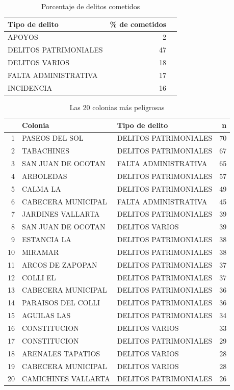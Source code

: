 \begin{table}[H]
\centering
\caption{Porcentaje de delitos cometidos} 
\begin{tabular}{lrr}
  \hline
Tipo de delito & \% de cometidos  \\ 
  \hline
APOYOS & 2 \\ 
  DELITOS PATRIMONIALES & 47 \\ 
  DELITOS VARIOS & 18  \\ 
  FALTA ADMINISTRATIVA & 17  \\ 
  INCIDENCIA & 16  \\ 
   \hline
\end{tabular}
\end{table}

\begin{table}[H]
\centering
\caption{Las 20 colonias más peligrosas} 
\begin{tabular}{rllr}
  \hline
 & Colonia & Tipo de delito & n \\ 
  \hline
1 & PASEOS DEL SOL & DELITOS PATRIMONIALES &  70 \\ 
  2 & TABACHINES & DELITOS PATRIMONIALES &  67 \\ 
  3 & SAN JUAN DE OCOTAN & FALTA ADMINISTRATIVA &  65 \\ 
  4 & ARBOLEDAS & DELITOS PATRIMONIALES &  57 \\ 
  5 & CALMA LA & DELITOS PATRIMONIALES &  49 \\ 
  6 & CABECERA MUNICIPAL & FALTA ADMINISTRATIVA &  45 \\ 
  7 & JARDINES VALLARTA & DELITOS PATRIMONIALES &  39 \\ 
  8 & SAN JUAN DE OCOTAN & DELITOS VARIOS &  39 \\ 
  9 & ESTANCIA LA & DELITOS PATRIMONIALES &  38 \\ 
  10 & MIRAMAR & DELITOS PATRIMONIALES &  38 \\ 
  11 & ARCOS DE ZAPOPAN & DELITOS PATRIMONIALES &  37 \\ 
  12 & COLLI EL & DELITOS PATRIMONIALES &  37 \\ 
  13 & CABECERA MUNICIPAL & DELITOS PATRIMONIALES &  36 \\ 
  14 & PARAISOS DEL COLLI & DELITOS PATRIMONIALES &  36 \\ 
  15 & AGUILAS LAS & DELITOS PATRIMONIALES &  34 \\ 
  16 & CONSTITUCION & DELITOS VARIOS &  33 \\ 
  17 & CONSTITUCION & DELITOS PATRIMONIALES &  29 \\ 
  18 & ARENALES TAPATIOS & DELITOS VARIOS &  28 \\ 
  19 & CABECERA MUNICIPAL & DELITOS VARIOS &  28 \\ 
  20 & CAMICHINES VALLARTA & DELITOS PATRIMONIALES &  26 \\ 
   \hline
\end{tabular}
\end{table}

